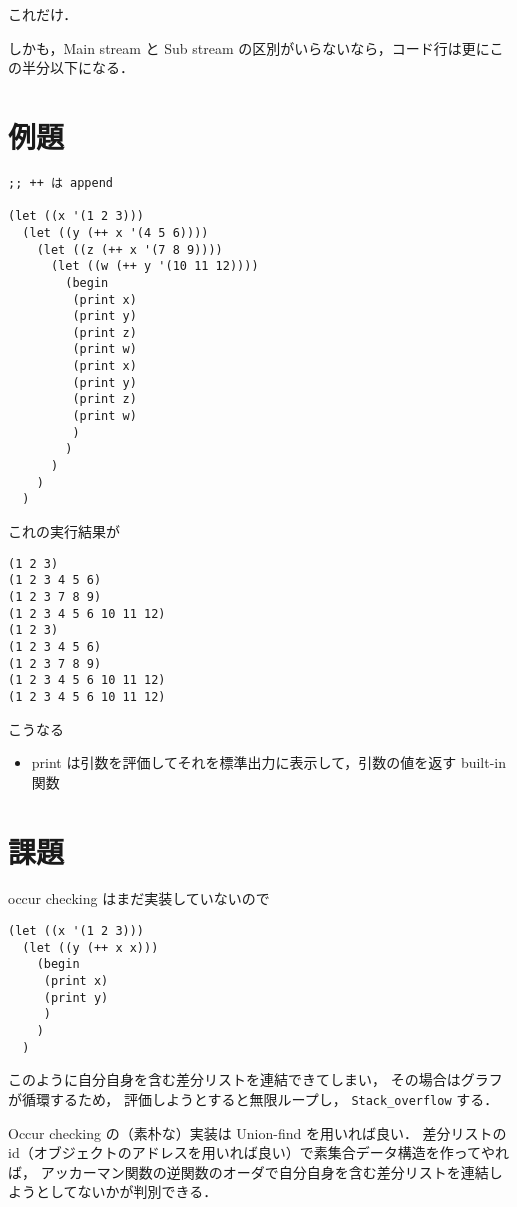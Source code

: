 \documentclass[10pt, a4j, twocolumn]{scrartcl}
\begin{document}
これだけ．

しかも，Main stream と Sub stream の区別がいらないなら，コード行は更にこの半分以下になる．


\section{例題}
\label{sec:org80981e9}

\begin{lstlisting}
;; ++ は append

(let ((x '(1 2 3)))
  (let ((y (++ x '(4 5 6))))
    (let ((z (++ x '(7 8 9))))
      (let ((w (++ y '(10 11 12))))
        (begin
         (print x)
         (print y)
         (print z)
         (print w)
         (print x)
         (print y)
         (print z)
         (print w)
         )
        )
      )
    )
  )
\end{lstlisting}


これの実行結果が

\begin{verbatim}
(1 2 3)
(1 2 3 4 5 6)
(1 2 3 7 8 9)
(1 2 3 4 5 6 10 11 12)
(1 2 3)
(1 2 3 4 5 6)
(1 2 3 7 8 9)
(1 2 3 4 5 6 10 11 12)
(1 2 3 4 5 6 10 11 12)
\end{verbatim}

こうなる
\begin{itemize}
\item print は引数を評価してそれを標準出力に表示して，引数の値を返す built-in 関数
\end{itemize}


\section{課題}
\label{sec:orgb99f873}

occur checking はまだ実装していないので

\begin{lstlisting}
(let ((x '(1 2 3)))
  (let ((y (++ x x)))
    (begin
     (print x)
     (print y)
     )
    )
  )
\end{lstlisting}

このように自分自身を含む差分リストを連結できてしまい，
その場合はグラフが循環するため，
評価しようとすると無限ループし， \texttt{Stack\_overflow} する．

Occur checking の（素朴な）実装は Union-find を用いれば良い．
差分リストの id（オブジェクトのアドレスを用いれば良い）で素集合データ構造を作ってやれば，
アッカーマン関数の逆関数のオーダで自分自身を含む差分リストを連結しようとしてないかが判別できる．
\end{document}
